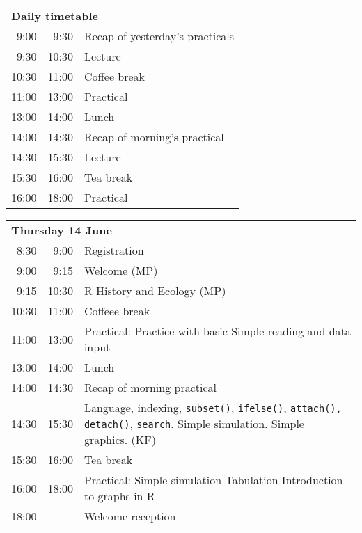 \noindent
\begin{tabular}{r@{ -- }rp{13cm}}
\multicolumn{3}{l}{\bf Daily timetable} \\
 9:00 &  9:30 & Recap of yesterday's practicals \\
 9:30 & 10:30 & Lecture \\
10:30 & 11:00 & Coffee break \\
11:00 & 13:00 & Practical \\
13:00 & 14:00 & Lunch \\
14:00 & 14:30 & Recap of morning's practical \\
14:30 & 15:30 & Lecture \\
15:30 & 16:00 & Tea break \\
16:00 & 18:00 & Practical \\[2em]
\end{tabular}

\noindent
\begin{tabular}{r@{ -- }rp{13cm}}
\multicolumn{3}{l}{\bf Thursday 14 June} \\
 8:30 &  9:00 & Registration \\
 9:00 &  9:15 & Welcome (MP) \\
 9:15 & 10:30 & R History and Ecology (MP) \\
10:30 & 11:00 & Coffeee break \\
11:00 & 13:00 & Practical:
                Practice with basic \R \newline
                Simple reading and data input \\
13:00 & 14:00 & Lunch \\
14:00 & 14:30 & Recap of morning practical \\
14:30 & 15:30 & Language, indexing,
                {\tt subset()}, {\tt ifelse()},
                \texttt{attach(), detach()},
                \texttt{search}. Simple simulation. Simple graphics. (KF)\\
15:30 & 16:00 & Tea break\\
16:00 & 18:00 & Practical: Simple simulation \newline
                Tabulation\newline
                Introduction to graphs in R \\
18:00 &       & Welcome reception \\[1em]
\end{tabular}

